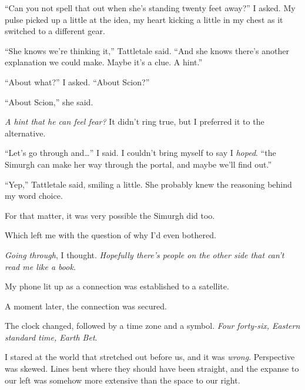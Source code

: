 ``Can you not spell that out when she's standing twenty feet away?'' I asked.  My pulse picked up a little at the idea, my heart kicking a little in my chest as it switched to a different gear.



``She knows we're thinking it,'' Tattletale said.  ``And she knows there's another explanation we could make.  Maybe it's a clue.  A hint.''



``About what?'' I asked.  ``About Scion?''



``About Scion,'' she said.



\emph{A hint that he can feel fear?}  It didn't ring true, but I preferred it to the alternative.



``Let's go through and\ldots'' I said.  I couldn't bring myself to say I \emph{hoped}.  ``\ldotsMaybe the Simurgh can make her way through the portal, and maybe we'll find out.''



``Yep,'' Tattletale said, smiling a little.  She probably knew the reasoning behind my word choice.



For that matter, it was very possible the Simurgh did too.



Which left me with the question of why I'd even bothered.



\emph{Going through}, I thought.  \emph{Hopefully there's people on the other side that can't read me like a book.}



My phone lit up as a connection was established to a satellite.



A moment later, the connection was secured.



The clock changed, followed by a time zone and a symbol.  \emph{Four forty-six, Eastern standard time, Earth Bet}.



I stared at the world that stretched out before us, and it was \emph{wrong}.  Perspective was skewed.  Lines bent where they should have been straight, and the expanse to our left was somehow more extensive than the space to our right.



